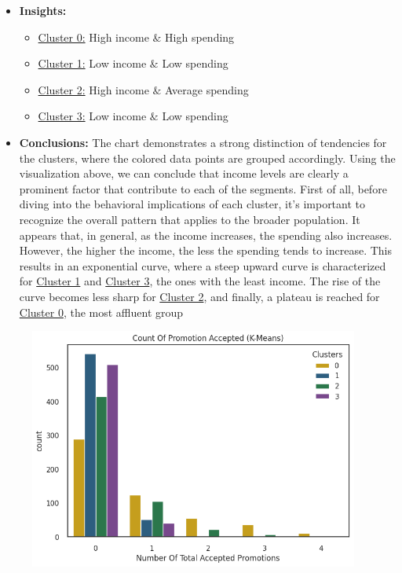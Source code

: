 \documentclass[11pt]{article}
\begin{document}
\begin{itemize}
	\item \textbf{Insights:}

\begin{itemize}
	\item \uline{\textcolor[HTML]{BF9000}{Cluster 0:}} High income $\&$ High spending

	\item \uline{\textcolor[HTML]{0B5394}{Cluster 1:}} Low income $\&$ Low spending

	\item \uline{\textcolor[HTML]{38761D}{Cluster 2:}} High income $\&$ Average spending

	\item \uline{\textcolor[HTML]{674EA7}{Cluster 3:}} Low income $\&$ Low spending

\end{itemize}
\end{itemize}
\vspace{1\baselineskip}
\begin{itemize}
	\item \textbf{Conclusions:} The chart demonstrates a strong distinction of tendencies for the clusters, where the colored data points are grouped accordingly. Using the visualization above, we can conclude that income levels are clearly a prominent factor that contribute to each of the segments. First of all, before diving into the behavioral implications of each cluster, it’s important to recognize the overall pattern that applies to the broader population. It appears that, in general, as the income increases, the spending also increases. However, the higher the income, the less the spending tends to increase. This results in an exponential curve, where a steep upward curve is characterized for \uline{\textcolor[HTML]{0B5394}{Cluster 1}} and \uline{\textcolor[HTML]{674EA7}{Cluster 3}}, the ones with the least income. The rise of the curve becomes less sharp for \uline{\textcolor[HTML]{38761D}{Cluster 2}}, and finally, a plateau is reached for \uline{\textcolor[HTML]{BF9000}{Cluster 0}}, the most affluent group

\end{itemize}
\vspace{2\baselineskip}
\begin{figure}[H]
\centering
\includegraphics[width=10.86cm,height=7.94cm]{./images/image34.png}
\end{figure}
\end{document}
